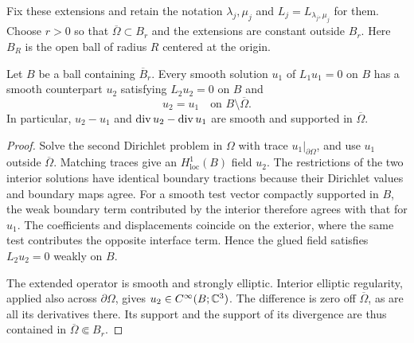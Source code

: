 Fix these extensions and retain the notation $\lambda_j,\mu_j$ and
$L_j=L_{\lambda_j,\mu_j}$ for them. Choose $r>0$ so that
$\overline\Omega\subset B_r$ and the extensions are constant outside
$B_r$. Here $B_R$ is the open ball of radius $R$ centered at the origin.

\begin{proposition}\label{prop:physical-transfer}
Let $B$ be a ball containing $\overline B_r$. Every smooth solution
$u_1$ of $L_1u_1=0$ on $B$ has a smooth counterpart $u_2$ satisfying
$L_2u_2=0$ on $B$ and
\[
 u_2=u_1\quad\text{on }B\setminus\overline\Omega.
\]
In particular, $u_2-u_1$ and
$\operatorname{div} u_2-\operatorname{div} u_1$ are smooth and supported in
$\overline\Omega$.
\end{proposition}

\begin{proof}
Solve the second Dirichlet problem in $\Omega$ with trace
$u_1|_{\partial\Omega}$, and use $u_1$ outside $\overline\Omega$.
Matching traces give an $H^1_{\mathrm{loc}}(B)$ field $u_2$.
The restrictions of the two interior solutions have identical boundary
tractions because their Dirichlet values and boundary maps agree.
For a smooth test vector compactly supported in $B$, the weak boundary
term contributed by the interior therefore agrees with that for $u_1$.
The coefficients and displacements coincide on the exterior, where the
same test contributes the opposite interface term. Hence the glued
field satisfies $L_2u_2=0$ weakly on $B$.

The extended operator is smooth and strongly elliptic. Interior
elliptic regularity, applied also across $\partial\Omega$, gives
$u_2\in C^\infty(B;\mathbb C^3)$. The difference is zero off
$\overline\Omega$, as are all its derivatives there. Its support and
the support of its divergence are thus contained in
$\overline\Omega\Subset B_r$.
\end{proof}
